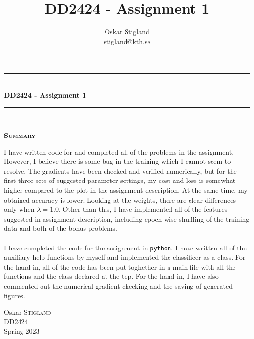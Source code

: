 \documentclass{article}
\title{DD2424 - Assignment 1}
\author{Oskar Stigland \\ stigland@kth.se}
\begin{document}

	\begin{titlepage}
		\begin{center} 
			
			\rule{\linewidth}{0.5mm}\\[0.5 cm]
			{ \huge \bfseries DD2424 - Assignment 1}\\[0.3 cm] %
			\rule{\linewidth}{0.5mm}\\[1 cm]
					
			\small\vfill
			\begin{center}
			\centering
			{\large \bfseries \textsc{Summary}}\\
			\vspace{1cm}
			\begin{minipage}{10cm}
				
				I have written code for and completed all of the problems in the assignment. However, I believe there is some bug in the training which I cannot seem to resolve. The gradients have been checked and verified numerically, but for the first three sets of suggested parameter settings, my cost and loss is somewhat higher compared to the plot in the assignment description. At the same time, my obtained accuracy is lower. Looking at the weights, there are clear differences only when $\lambda = 1.0$. Other than this, I have implemented all of the features suggested in assignment description, including epoch-wise shuffling of the training data and both of the bonus problems.\\\\
%
	I have completed the code for the assignment in \texttt{python}. I have written all of the auxiliary help functions by myself and implemented the classificer as a class. For the hand-in, all of the code has been put toghether in a main file with all the functions and the class declared at the top. For the hand-in, I have also commented out the numerical gradient checking and the saving of generated figures. 
			\end{minipage}
			\end{center}
			\large\vfill
						

		\end{center}	
		
		\begin{minipage}{0.4\textwidth}
			\begin{flushleft} \large
				Oskar \textsc{Stigland}\\
				DD2424\\
				Spring 2023
			\end{flushleft}
		\end{minipage}	

	\end{titlepage}
\end{document}
